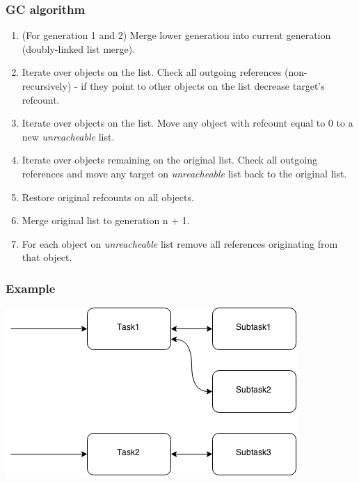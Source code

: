 \documentclass{beamer}
\begin{document}
    \begin{frame}
        \frametitle{GC algorithm}
        \begin{enumerate}
            \item (For generation 1 and 2) Merge lower generation into current generation (doubly-linked list merge).
            \item Iterate over objects on the list. Check all outgoing references (non-recursively) - if they point to other objects on the list decrease target's refcount.
            \item Iterate over objects on the list. Move any object with refcount equal to 0 to a new \textit{unreacheable} list.
            \item Iterate over objects remaining on the original list. Check all outgoing references and move any target on \textit{unreacheable} list back to the original list.
            \item Restore original refcounts on all objects.
            \item Merge original list to generation n + 1.
            \item For each object on \textit{unreacheable} list remove all references originating from that object.
        \end{enumerate}
    \end{frame}

    \begin{frame}
        \frametitle{Example}
        \begin{center}
            \includegraphics[height=0.5\textheight]{graph_initial.png}
        \end{center}
    \end{frame}
\end{document}
